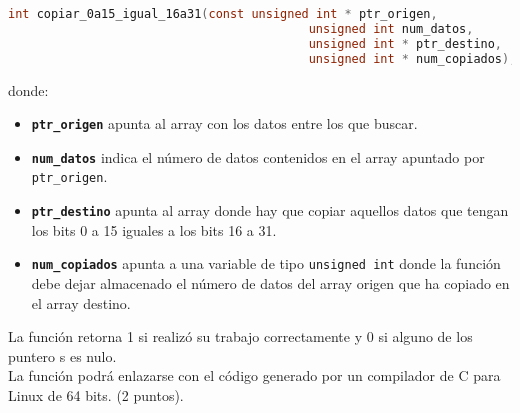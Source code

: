 \documentclass[12pt,letterpaper]{article}
\begin{document}
\begin{enumerate}
	\begin{lstlisting}[language=C]
		int copiar_0a15_igual_16a31(const unsigned int * ptr_origen,
		                                  unsigned int num_datos,
		                                  unsigned int * ptr_destino,
		                                  unsigned int * num_copiados);
	\end{lstlisting}
	donde:
	\begin{itemize}
		\item \textbf{\texttt{ptr\_origen}} apunta al array con los datos entre los que buscar.
		\item \textbf{\texttt{num\_datos}} indica el número de datos contenidos en el array apuntado por \texttt{ptr\_origen}.
		\item \textbf{\texttt{ptr\_destino}} apunta al array donde hay que copiar aquellos datos que tengan los bits 0 a 15 iguales a los bits 16 a 31.
		\item \textbf{\texttt{num\_copiados}} apunta a una variable de tipo \texttt{unsigned int} donde la función debe dejar almacenado el número de datos del array origen que ha copiado en el array destino.
	\end{itemize}
	La función retorna 1 si realizó su trabajo correctamente y 0 si alguno de los puntero s es nulo.\\
	La función podrá enlazarse con el código generado por un compilador de C para Linux de 64 bits. (2 puntos).\\
	

\end{enumerate}
\end{document}
